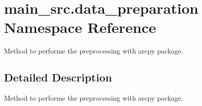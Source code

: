 \hypertarget{namespacemain__src_1_1data__preparation}{\section{main\-\_\-src.\-data\-\_\-preparation Namespace Reference}
\label{namespacemain__src_1_1data__preparation}
}


Method to performe the preprocessing with arcpy package.  




\subsection{Detailed Description}
Method to performe the preprocessing with arcpy package. 